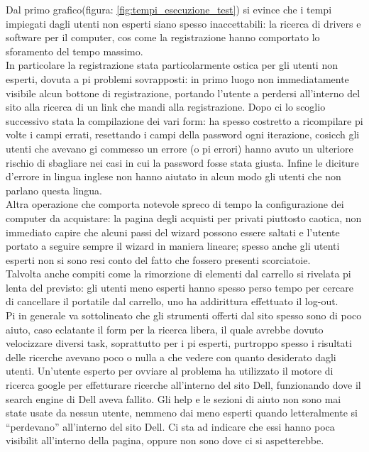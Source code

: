 Dal primo grafico(figura: \ref{fig:tempi_esecuzione_test}) si evince che i tempi impiegati dagli utenti non esperti siano spesso inaccettabili: la ricerca di drivers e software per il computer, cos come la registrazione hanno comportato lo sforamento del tempo massimo. \\ 
In particolare la registrazione  stata particolarmente ostica per gli utenti non esperti, dovuta a pi problemi sovrapposti: in primo luogo  non  immediatamente visibile alcun bottone di registrazione, portando l'utente a perdersi all'interno del sito alla ricerca di un link che mandi alla registrazione. Dopo ci lo scoglio successivo  stata la compilazione dei vari form: ha spesso costretto a ricompilare pi volte i campi errati, resettando i campi della password ogni iterazione, cosicch gli utenti che avevano gi commesso un errore (o pi errori) hanno avuto un ulteriore rischio di sbagliare nei casi in cui la password fosse stata giusta. Infine le diciture d'errore in lingua inglese non hanno aiutato in alcun modo gli utenti che non parlano questa lingua.\\
Altra operazione che comporta notevole spreco di tempo  la configurazione dei computer da acquistare: la pagina degli acquisti per privati  piuttosto caotica, non  immediato capire che alcuni passi del wizard possono essere saltati e l'utente  portato a seguire sempre il wizard in maniera lineare; spesso anche gli utenti esperti non si sono resi conto del fatto che fossero presenti scorciatoie.\\
Talvolta anche compiti come la rimorzione di elementi dal carrello si  rivelata pi lenta del previsto: gli utenti meno esperti hanno spesso perso tempo per cercare di cancellare il portatile dal carrello, uno ha addirittura effettuato il log-out.\\
Pi in generale va sottolineato che gli strumenti offerti dal sito spesso sono di poco aiuto, caso eclatante  il form per la ricerca libera, il quale avrebbe dovuto velocizzare diversi task, soprattutto per i pi esperti, purtroppo spesso i risultati delle ricerche avevano poco o nulla a che vedere con quanto desiderato dagli utenti. Un'utente esperto per ovviare al problema ha utilizzato il motore di ricerca google per effetturare ricerche all'interno del sito Dell, funzionando dove il search engine di Dell aveva fallito.
Gli help e le sezioni di aiuto non sono mai state usate da nessun utente, nemmeno dai meno esperti quando letteralmente si ``perdevano'' all'interno del sito Dell. Ci sta ad indicare che essi hanno poca visibilit all'interno della pagina, oppure non sono dove ci si aspetterebbe.\\
